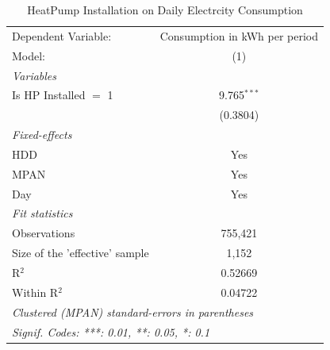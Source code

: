 
\begin{table}[htbp]
   \caption{\label{tab:hp-install} HeatPump Installation on Daily Electrcity Consumption}
   \centering
   \begin{tabular}{lc}
      \tabularnewline \midrule \midrule
      Dependent Variable:            & Consumption in kWh per period\\  
      Model:                         & (1)\\  
      \midrule
      \emph{Variables}\\
      Is HP Installed $=$ 1       & 9.765$^{***}$\\   
                                     & (0.3804)\\   
      \midrule
      \emph{Fixed-effects}\\
      HDD                            & Yes\\  
      MPAN                           & Yes\\  
      Day                            & Yes\\  
      \midrule
      \emph{Fit statistics}\\
      Observations                   & 755,421\\  
      Size of the 'effective' sample & 1,152\\  
      R$^2$                          & 0.52669\\  
      Within R$^2$                   & 0.04722\\  
      \midrule \midrule
      \multicolumn{2}{l}{\emph{Clustered (MPAN) standard-errors in parentheses}}\\
      \multicolumn{2}{l}{\emph{Signif. Codes: ***: 0.01, **: 0.05, *: 0.1}}\\
   \end{tabular}
\end{table}


